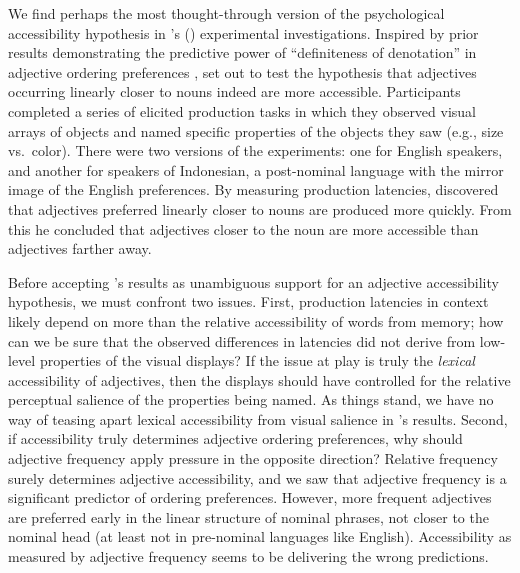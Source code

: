 \documentclass{sp}
\begin{document}
We find perhaps the most thought-through version of the psychological accessibility hypothesis in \citeauthor{martin1969competence}'s (\citeyear{martin1969competence}) experimental investigations. Inspired by prior results demonstrating the predictive power of ``definiteness of denotation'' in adjective ordering preferences \citep{martin1969}, \citeauthor{martin1969competence} set out to test the hypothesis that adjectives occurring linearly closer to nouns indeed are more accessible. Participants completed a series of elicited production tasks in which they observed visual arrays of objects and named specific properties of the objects they saw (e.g., size vs.~color). There were two versions of the experiments: one for English speakers, and another for speakers of Indonesian, a post-nominal language with the mirror image of the English preferences. By measuring production latencies, \citeauthor{martin1969competence} discovered that adjectives preferred linearly closer to nouns are produced more quickly. From this he concluded that adjectives closer to the noun are more accessible than adjectives farther away. 

Before accepting \citeauthor{martin1969competence}'s results as unambiguous support for an adjective accessibility hypothesis, we must confront two issues. First, production latencies in context likely depend on more than the relative accessibility of words from memory; how can we be sure that the observed differences in latencies did not derive from low-level properties of the visual displays? If the issue at play is truly the \emph{lexical} accessibility of adjectives, then the displays should have controlled for the relative perceptual salience of the properties being named. As things stand, we have no way of teasing apart lexical accessibility from visual salience in \citeauthor{martin1969competence}'s results.
Second, if accessibility truly determines adjective ordering preferences, why should adjective frequency apply pressure in the opposite direction? Relative frequency surely determines adjective accessibility, and we saw that adjective frequency is a significant predictor of ordering preferences. However, more frequent adjectives are preferred early in the linear structure of nominal phrases, not closer to the nominal head (at least not in pre-nominal languages like English). Accessibility as measured by adjective frequency seems to be delivering the wrong predictions.
\end{document}
